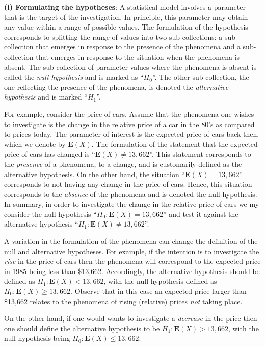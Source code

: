 \documentclass[
]{krantz}
\newcommand{\Expec}{\mathbf{E}}
\theoremstyle{definition}
\theoremstyle{definition}
\theoremstyle{definition}
\theoremstyle{remark}
\begin{document}
{\textbf{(i) Formulating the hypotheses}}: A statistical model involves a
parameter that is the target of the investigation. In principle, this
parameter may obtain any value within a range of possible values. The
formulation of the hypothesis corresponds to splitting the range of
values into two sub-collections: a sub-collection that emerges in
response to the presence of the phenomena and a sub-collection that
emerges in response to the situation when the phenomena is absent. The
sub-collection of parameter values where the phenomena is absent is
called the \emph{null hypothesis} and is marked as ``\(H_0\)''. The other
sub-collection, the one reflecting the presence of the phenomena, is
denoted the \emph{alternative hypothesis} and is marked ``\(H_1\)''.

For example, consider the price of cars. Assume that the phenomena one
wishes to investigate is the change in the relative price of a car in
the 80's as compared to prices today. The parameter of interest is the
expected price of cars back then, which we denote by \(\Expec(X)\). The
formulation of the statement that the expected price of cars has changed
is ``\(\Expec(X) \not = 13,662\)''. This statement corresponds to the
\emph{presence} of a phenomena, to a change, and is customarily defined as
the alternative hypothesis. On the other hand, the situation
``\(\Expec(X) = 13,662\)'' corresponds to not having any change in the price
of cars. Hence, this situation corresponds to the \emph{absence} of the
phenomena and is denoted the null hypothesis. In summary, in order to
investigate the change in the relative price of cars we my consider the
null hypothesis ``\(H_0:\Expec(X) = 13,662\)'' and test it against the
alternative hypothesis ``\(H_1: \Expec(X)\not = 13,662\)''.

A variation in the formulation of the phenomena can change the
definition of the null and alternative hypotheses. For example, if the
intention is to investigate the \emph{rise} in the price of cars then the
phenomena will correspond to the expected price in 1985 being less than
\$13,662. Accordingly, the alternative hypothesis should be defined as
\(H_1: \Expec(X) < 13,662\), with the null hypothesis defined as
\(H_0: \Expec(X) \geq 13,662\). Observe that in this case an expected
price larger than \$13,662 relates to the phenomena of rising (relative)
prices \emph{not} taking place.

On the other hand, if one would wants to investigate a \emph{decrease} in the
price then one should define the alternative hypothesis to be
\(H_1: \Expec(X) > 13,662\), with the null hypothesis being
\(H_0: \Expec(X) \leq 13,662\).
\end{document}
